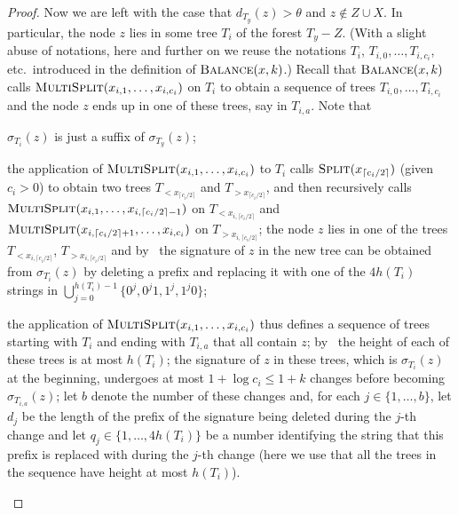 \documentclass[kpfonts]{patmorin}
\let\leq\leqslant
\begin{document}
\begin{proof}
  Now we are left with the case that $d_{T_y}(z)> \theta$ and $z\not\in Z\cup X$. In particular, the node $z$ lies in some tree $T_i$ of the forest $T_y - Z$.
  (With a slight abuse of notations, here and further on we reuse the notations $T_i$, $T_{i,0},\ldots,T_{i,c_i}$, etc.\ introduced in the definition of $\textsc{Balance}(x,k)$.)
  Recall that $\textsc{Balance}(x,k)$ calls $\textsc{MultiSplit}(x_{i,1},\ldots,x_{i,c_i})$ on $T_i$ to obtain a sequence of trees $T_{i,0},\ldots,T_{i,c_i}$ and the node $z$ ends up in one of these trees, say in $T_{i,a}$.
  Note that
  \begin{compactenum}[(i)]
  \item $\sigma_{T_i}(z)$ is just a suffix of $\sigma_{T_y}(z)$;
  \item the application of $\textsc{MultiSplit}(x_{i,1},\ldots,x_{i,c_i})$ to $T_i$ calls $\textsc{Split}(x_{
  \lceil c_i/2\rceil})$ (given $c_i>0$) to obtain two trees $T_{<x_{\lceil c_i/2\rceil}}$ and $T_{>x_{\lceil c_i/2\rceil}}$, and then recursively calls $\textsc{MultiSplit}(x_{i,1},\ldots,x_{i,\lceil c_i/2\rceil-1})$  on $T_{<x_{i,\lceil c_i/2\rceil}}$ and $\textsc{MultiSplit}(x_{i,\lceil c_i/2\rceil+1},\ldots,x_{i,c_i})$  on $T_{>x_{i,\lceil c_i/2\rceil}}$;
  the node $z$ lies in one of the trees $T_{<x_{i,\lceil c_i/2\rceil}}$, $T_{>x_{i,\lceil c_i/2\rceil}}$ and by~ the signature of $z$ in the new tree can be obtained from $\sigma_{T_i}(z)$ by deleting a prefix and replacing it with one of the $4h(T_i)$ strings in $\bigcup_{j=0}^{h(T_i)-1}\{0^j,0^j1,1^j,1^j0\}$;
  \item the application of $\textsc{MultiSplit}(x_{i,1},\ldots,x_{i,c_i})$ thus defines a sequence of trees starting with $T_i$ and ending with $T_{i,a}$ that all contain $z$;
  by~ the height of each of these trees is at most $h(T_i)$;
  the signature of $z$ in these trees, which is $\sigma_{T_i}(z)$ at the beginning, undergoes at most $1+\log c_i \leq 1+k$ changes
  before becoming $\sigma_{T_{i,a}}(z)$; let $b$ denote the number of these changes and, for each $j\in\{1,\ldots,b\}$, let $d_j$ be the length of the prefix of the signature being deleted during the $j$-th change and let $q_j\in \{1, \dots, 4h(T_i)\}$ be a number identifying the string that this prefix is replaced with during the $j$-th change (here we use that all the trees in the sequence have height at most $h(T_i)$).
  \end{compactenum}


\end{proof}
\end{document}
